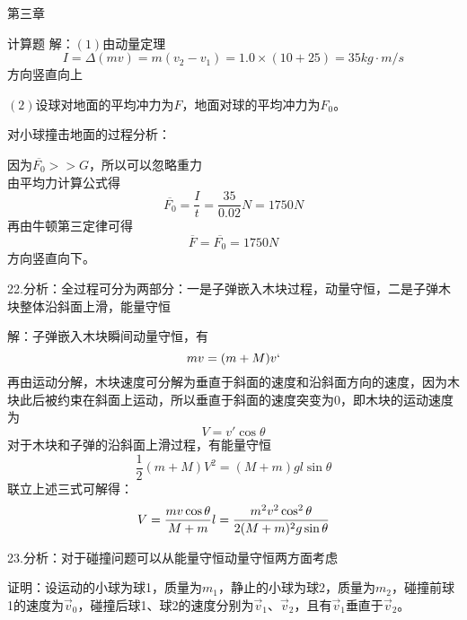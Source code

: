 \documentclass[a4paper,fleqn,twocolumn]{ctexart}
\begin{document}
\begin{section}{第三章}
\begin{subsection}{计算题}
解：$(1)$由动量定理
\begin{equation*}
I=\Delta(mv)=m(v_2-v_1)=1.0\times(10+25)=35kg\cdot m/s
\end{equation*}
方向竖直向上

$(2)$设球对地面的平均冲力为$F$，地面对球的平均冲力为$F_0$。

对小球撞击地面的过程分析：

因为$\overline{F_0}>>G$，所以可以忽略重力\\
由平均力计算公式得
\begin{equation*}
\overline{F_0}=\frac{I}{t}=\frac{35}{0.02}N=1750N
\end{equation*}
再由牛顿第三定律可得
\begin{equation*}
\overline{F}=\overline{F_0}=1750N
\end{equation*}
方向竖直向下。

22.分析：全过程可分为两部分：一是子弹嵌入木块过程，动量守恒，二是子弹木块整体沿斜面上滑，能量守恒

解：子弹嵌入木块瞬间动量守恒，有
\begin{equation*}
mv=(m+M)v`
\end{equation*}
再由运动分解，木块速度可分解为垂直于斜面的速度和沿斜面方向的速度，因为木块此后被约束在斜面上运动，所以垂直于斜面的速度突变为$0$，即木块的运动速度为
\begin{equation*}
V=v'\cos\theta
\end{equation*}
对于木块和子弹的沿斜面上滑过程，有能量守恒
\begin{equation*}
\frac{1}{2}(m+M)V^2=(M+m)gl\sin\theta
\end{equation*}
联立上述三式可解得：
\begin{equation*}
V=\frac{mv\cos\theta}{M+m}\\
l=\frac{m^2v^2\cos^2\theta}{2(M+m)^2g\sin\theta}
\end{equation*}

23.分析：对于碰撞问题可以从能量守恒动量守恒两方面考虑

证明：设运动的小球为球1，质量为$m_1$，静止的小球为球2，质量为$m_2$，碰撞前球1的速度为$\vec{v}_0$，碰撞后球1、球2的速度分别为$\vec{v}_1、\vec{v}_2$，且有$\vec{v}_1$垂直于$\vec{v}_2$。


\end{subsection}
\end{section}
\end{document}

